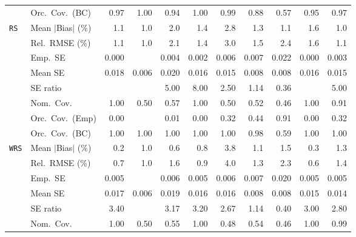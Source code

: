 \begin{landscape}
\begin{longtable}{llrrrrrrrrr}
 & Orc.\ Cov.\ (BC) & \cellcolor{rankthree}0.97 & 1.00 & \cellcolor{ranktwo}0.94 & 1.00 & 0.99 & 0.88 & 0.57 & \cellcolor{rankone}0.95 & \cellcolor{rankthree}0.97 \\
\addlinespace[2pt]
\quad \texttt{RS} & Mean $|$Bias$|$ (\%) & \cellcolor{ranktwo}1.1 & \cellcolor{rankone}1.0 & 2.0 & 1.4 & 2.8 & \cellcolor{rankthree}1.3 & \cellcolor{ranktwo}1.1 & 1.6 & \cellcolor{rankone}1.0 \\
 & Rel.\ RMSE (\%) & \cellcolor{ranktwo}1.1 & \cellcolor{rankone}1.0 & 2.1 & \cellcolor{rankthree}1.4 & 3.0 & 1.5 & 2.4 & 1.6 & \cellcolor{ranktwo}1.1 \\
 & Emp.\ SE & 0.000 &  & 0.004 & 0.002 & 0.006 & 0.007 & 0.022 & 0.000 & 0.003 \\
 & Mean SE & 0.018 & 0.006 & 0.020 & 0.016 & 0.015 & 0.008 & 0.008 & 0.016 & 0.015 \\
 & SE ratio &  &  & 5.00 & 8.00 & \cellcolor{rankthree}2.50 & \cellcolor{rankone}1.14 & \cellcolor{ranktwo}0.36 &  & 5.00 \\
 & Nom.\ Cov. & \cellcolor{ranktwo}1.00 & 0.50 & \cellcolor{rankthree}0.57 & \cellcolor{ranktwo}1.00 & 0.50 & 0.52 & 0.46 & \cellcolor{ranktwo}1.00 & \cellcolor{rankone}0.91 \\
 & Orc.\ Cov.\ (Emp) & 0.00 &  & 0.01 & 0.00 & \cellcolor{rankthree}0.32 & \cellcolor{ranktwo}0.44 & \cellcolor{rankone}0.91 & 0.00 & \cellcolor{rankthree}0.32 \\
 & Orc.\ Cov.\ (BC) & \cellcolor{ranktwo}1.00 & \cellcolor{ranktwo}1.00 & \cellcolor{ranktwo}1.00 & \cellcolor{ranktwo}1.00 & \cellcolor{ranktwo}1.00 & \cellcolor{rankone}0.98 & \cellcolor{rankthree}0.59 & \cellcolor{ranktwo}1.00 & \cellcolor{ranktwo}1.00 \\
\addlinespace[2pt]
\quad \texttt{WRS} & Mean $|$Bias$|$ (\%) & \cellcolor{rankone}0.2 & 1.0 & \cellcolor{rankthree}0.6 & 0.8 & 3.8 & 1.1 & 1.5 & \cellcolor{ranktwo}0.3 & 1.3 \\
 & Rel.\ RMSE (\%) & \cellcolor{ranktwo}0.7 & 1.0 & 1.6 & \cellcolor{rankthree}0.9 & 4.0 & 1.3 & 2.3 & \cellcolor{rankone}0.6 & 1.4 \\
 & Emp.\ SE & 0.005 &  & 0.006 & 0.005 & 0.006 & 0.007 & 0.020 & 0.005 & 0.005 \\
 & Mean SE & 0.017 & 0.006 & 0.019 & 0.016 & 0.016 & 0.008 & 0.008 & 0.015 & 0.014 \\
 & SE ratio & 3.40 &  & 3.17 & 3.20 & \cellcolor{rankthree}2.67 & \cellcolor{rankone}1.14 & \cellcolor{ranktwo}0.40 & 3.00 & 2.80 \\
 & Nom.\ Cov. & \cellcolor{rankone}1.00 & 0.50 & \cellcolor{ranktwo}0.55 & \cellcolor{rankone}1.00 & 0.48 & \cellcolor{rankthree}0.54 & 0.46 & \cellcolor{rankone}1.00 & \cellcolor{rankone}0.99 \\

\end{longtable}
\end{landscape}
